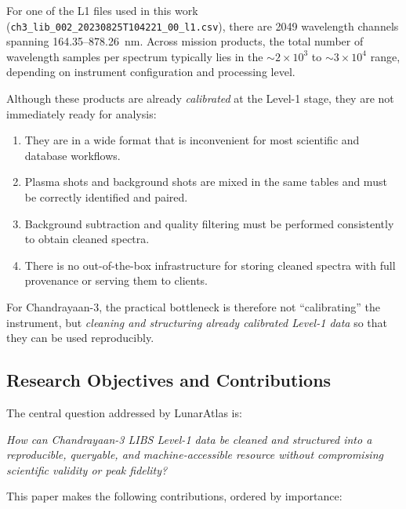 \documentclass[12pt,a4paper]{article}
\begin{document}
For one of the L1 files used in this work (\texttt{ch3\_lib\_002\_20230825T104221\_00\_l1.csv}), there are 2049 wavelength channels spanning 164.35--878.26~nm. Across mission products, the total number of wavelength samples per spectrum typically lies in the \(\sim 2\times 10^3\) to \(\sim 3\times 10^4\) range, depending on instrument configuration and processing level.

Although these products are already \emph{calibrated} at the Level-1 stage, they are not immediately ready for analysis:

\begin{enumerate}[label=(\roman*),nosep]
  \item They are in a wide format that is inconvenient for most scientific and database workflows.
  \item Plasma shots and background shots are mixed in the same tables and must be correctly identified and paired.
  \item Background subtraction and quality filtering must be performed consistently to obtain cleaned spectra.
  \item There is no out-of-the-box infrastructure for storing cleaned spectra with full provenance or serving them to clients.
\end{enumerate}

For Chandrayaan-3, the practical bottleneck is therefore not “calibrating” the instrument, but \emph{cleaning and structuring already calibrated Level-1 data} so that they can be used reproducibly.

\subsection{Research Objectives and Contributions}

The central question addressed by LunarAtlas is:

\medskip
\noindent\emph{How can Chandrayaan-3 LIBS Level-1 data be cleaned and structured into a reproducible, queryable, and machine-accessible resource without compromising scientific validity or peak fidelity?}
\medskip

This paper makes the following contributions, ordered by importance:
\end{document}
